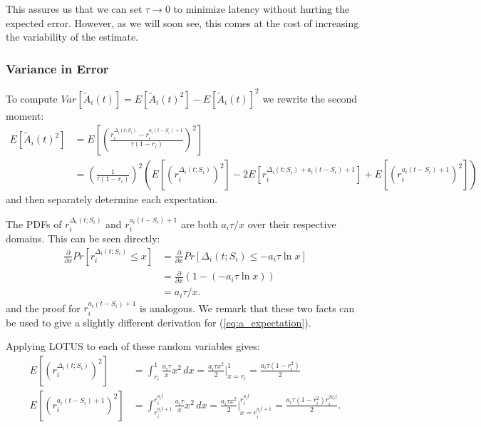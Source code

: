 This assures us that we can set $\tau \rightarrow 0$ to minimize latency without hurting the expected error. However, as we will soon see, this comes at the cost of increasing the variability of the estimate.

\subsubsection{Variance in Error}

To compute $Var \left[ \tilde{A}_i(t) \right] = E \left[ \tilde{A}_i(t)^2 \right] - E \left[ \tilde{A}_i(t) \right]^2$ we rewrite the second moment:
\begin{align*}
E \left[ \tilde{A}_i(t)^2 \right] &= E \left[ \left( \frac{r_i^{\Delta_i(t; S_i)} - r_i^{a_i(t - S_i) + 1}}{\tau(1 - r_i)} \right)^2 \right] \\
&= \left( \frac{1}{\tau(1 - r_i)} \right)^2 \left( E \left[ (r_i^{\Delta_i(t; S_i)})^2 \right ] - 2 E \left[ r_i^{\Delta_i(t; S_i) + a_i(t - S_i) + 1} \right] + E \left[ (r_i^{a_i(t - S_i) + 1})^2 \right] \right)
\end{align*}
and then separately determine each expectation.

The PDFs of $r_i^{\Delta_i(t; S_i)}$ and $r_i^{a_i(t - S_i) + 1}$ are both $a_i \tau / x$ over their respective domains. This can be seen directly:
\begin{align*}
\frac{\partial}{\partial x} Pr \left[ r_i^{\Delta_i(t; S_i)} \le x \right] &= \frac{\partial}{\partial x} Pr \left[ \Delta_i(t; S_i) \le -a_i \tau \ln x \right] \\
&= \frac{\partial}{\partial x} (1 - (-a_i \tau \ln x)) \\
&= a_i \tau / x .
\end{align*}
and the proof for $r_i^{a_i(t - S_i) + 1}$ is analogous. We remark that these two facts can be used to give a slightly different derivation for (\ref{eq:a_expectation}). 

Applying LOTUS to each of these random variables gives:
\begin{align*}
E \left[ (r_i^{\Delta_i(t; S_i)})^2 \right ] &= \int_{r_i}^1 \frac{a_i \tau}{x} x^2 \,dx = \frac{a_i \tau x^2}{2} \bigg|_{x = r_i}^1 = \frac{a_i \tau (1 - r_i^2)}{2} \\
E \left[ (r_i^{a_i(t - S_i) + 1})^2 \right] &= \int_{r_i^{a_i t + 1}}^{r_i^{a_i t}} \frac{a_i \tau}{x} x^2 \,dx = \frac{a_i \tau x^2}{2} \bigg|_{x = r_i^{a_i t + 1}}^{r_i^{a_i t}} = \frac{a_i \tau (1 - r_i^2) r_i^{2 a_i t}}{2} .
\end{align*}

